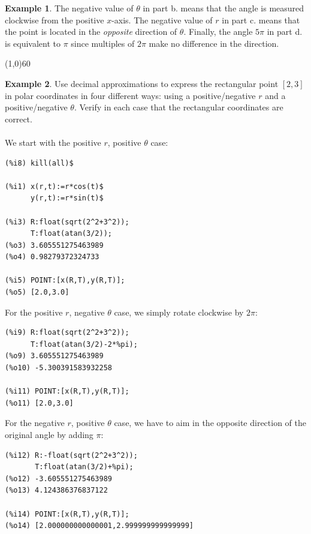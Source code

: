 \documentclass[10.5pt,twoside]{report}
\theoremstyle{definition}
\newtheorem{exmp}{Example}[section]
\begin{document}
\begin{exmp}
The negative value of $\theta$ in part b. means that the angle is measured clockwise from the positive $x$-axis. The negative value of $r$ in part c. means that the point is located in the \textit{opposite} direction of $\theta$.  Finally, the angle $5\pi$ in part d. is equivalent to $\pi$ since multiples of $2\pi$ make no difference in the direction.

\end{exmp}

\line(1,0){60}
\linethickness{0.5mm}


\begin{exmp}  Use decimal approximations to express the rectangular point $[2,3]$ in polar coordinates in four different ways:  using a positive/negative $r$ and a positive/negative $\theta$.  Verify in each case that the rectangular coordinates are correct.\\

${}$\\

We start with the positive $r$, positive $\theta$ case:

\begin{verbatim}
(%i8) kill(all)$

(%i1) x(r,t):=r*cos(t)$
      y(r,t):=r*sin(t)$
      
(%i3) R:float(sqrt(2^2+3^2));
      T:float(atan(3/2));
(%o3) 3.605551275463989
(%o4) 0.98279372324733

(%i5) POINT:[x(R,T),y(R,T)];
(%o5) [2.0,3.0]
\end{verbatim}

For the positive $r$, negative $\theta$ case, we simply rotate clockwise by $2\pi$:

\begin{verbatim}
(%i9) R:float(sqrt(2^2+3^2));
      T:float(atan(3/2)-2*%pi);
(%o9) 3.605551275463989
(%o10) -5.300391583932258

(%i11) POINT:[x(R,T),y(R,T)];
(%o11) [2.0,3.0]
\end{verbatim}

For the negative $r$, positive $\theta$ case, we have to aim in the opposite direction of the original angle by adding $\pi$:

\begin{verbatim}
(%i12) R:-float(sqrt(2^2+3^2));
       T:float(atan(3/2)+%pi);
(%o12) -3.605551275463989
(%o13) 4.124386376837122

(%i14) POINT:[x(R,T),y(R,T)];
(%o14) [2.000000000000001,2.999999999999999]
\end{verbatim}


\end{exmp}
\end{document}
